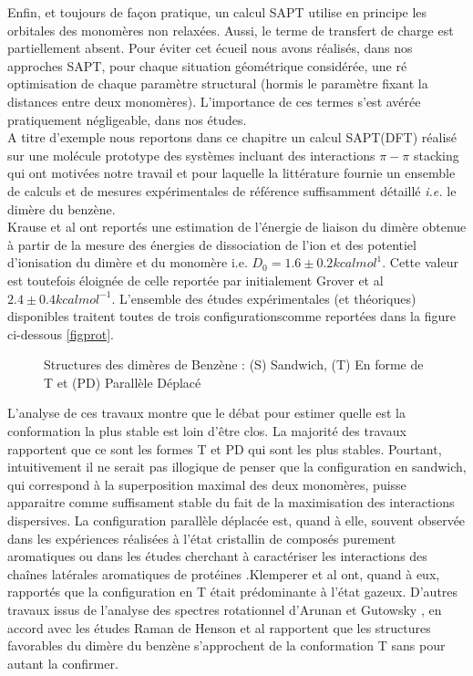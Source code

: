 	
	Enfin, et toujours de façon pratique, un calcul SAPT utilise en principe les orbitales des monomères non relaxées. Aussi, le terme de transfert de charge est partiellement absent. Pour éviter cet écueil nous avons réalisés, dans nos approches SAPT, pour chaque situation géométrique considérée, une ré optimisation de chaque paramètre structural (hormis le paramètre fixant la distances entre deux monomères). L’importance de ces termes s’est avérée pratiquement négligeable, dans nos études.\\
	
	A titre d’exemple nous reportons dans ce chapitre un calcul SAPT(DFT) réalisé sur une molécule prototype des systèmes incluant des interactions $\pi-\pi$ stacking qui ont motivées notre travail et pour laquelle la littérature fournie un ensemble de calculs et de mesures expérimentales de référence suffisamment détaillé \textit{i.e.} le dimère du benzène. \\
	
	Krause et al \cite{krause1991binding} ont reportés une estimation de l’énergie de liaison du dimère obtenue à partir de la mesure  des énergies de dissociation de l'ion et des potentiel d’ionisation du dimère et du monomère i.e. $D_{0}= 1.6 \pm 0.2 kcal mol^{1}$. Cette valeur est toutefois éloignée de celle reportée par initialement Grover et al \cite{grover1987dissociation} $2.4 \pm 0.4 kcal mol^{-1}$. 
	L’ensemble des études expérimentales (et théoriques) disponibles traitent toutes de trois configurationscomme reportées dans la figure ci-dessous \ref{figprot}.
	
	\begin{figure}[H]
		\centering
		\caption[Structures du dimère de Benzène]{Structures des dimères de Benzène : (S) Sandwich, (T) En forme de T et (PD) Parallèle Déplacé}
	\end{figure}
	
	L’analyse de ces travaux montre que le débat pour estimer quelle est la conformation la plus stable est loin d’être clos. La majorité des travaux rapportent que ce sont les formes T et PD qui sont les plus stables. Pourtant, intuitivement il ne serait pas illogique de penser que la configuration en sandwich, qui correspond à la superposition maximal des deux monomères, puisse apparaitre comme suffisament stable du fait de la maximisation des interactions dispersives. La configuration parallèle déplacée est, quand à elle, souvent observée dans les expériences réalisées à l’état cristallin de composés purement aromatiques \cite{hunter1991pi,fyfe1997synthetic,rebek1996assembly} ou dans les études cherchant à caractériser les interactions des chaînes latérales aromatiques de protéines \cite{hunter1991pi,burley1985aromatic}.Klemperer et al \cite{janda1975benzene} ont, quand à eux, rapportés que la configuration en T était prédominante à l’état gazeux. D’autres travaux issus de l’analyse des spectres rotationnel d'Arunan et Gutowsky \cite{arunan1993rotational}, en accord avec les études Raman de Henson et al \cite{henson1992raman} rapportent que les structures favorables du dimère du benzène s’approchent de la conformation T sans pour autant la confirmer.\\ 
	

